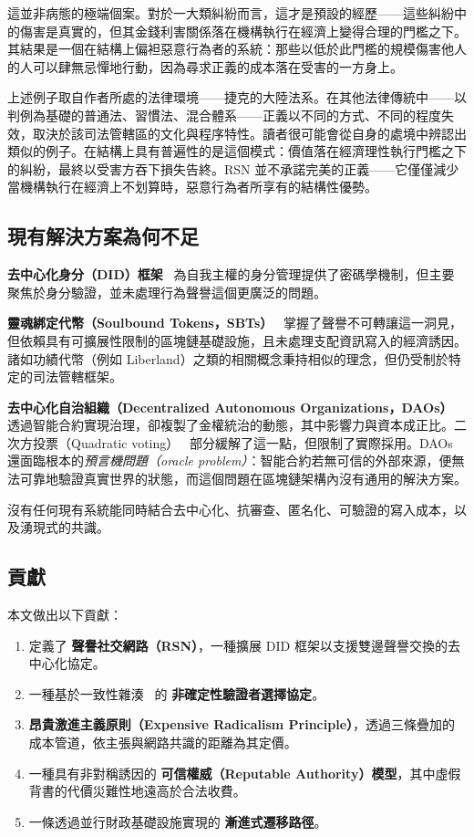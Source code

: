 \documentclass[11pt,a4paper,twocolumn]{article}
\begin{document}
這並非病態的極端個案。對於一大類糾紛而言，這才是預設的經歷——這些糾紛中的傷害是真實的，但其金錢利害關係落在機構執行在經濟上變得合理的門檻之下。其結果是一個在結構上偏袒惡意行為者的系統：那些以低於此門檻的規模傷害他人的人可以肆無忌憚地行動，因為尋求正義的成本落在受害的一方身上。

上述例子取自作者所處的法律環境——捷克的大陸法系。在其他法律傳統中——以判例為基礎的普通法、習慣法、混合體系——正義以不同的方式、不同的程度失效，取決於該司法管轄區的文化與程序特性。讀者很可能會從自身的處境中辨認出類似的例子。在結構上具有普遍性的是這個模式：價值落在經濟理性執行門檻之下的糾紛，最終以受害方吞下損失告終。RSN 並不承諾完美的正義——它僅僅減少當機構執行在經濟上不划算時，惡意行為者所享有的結構性優勢。

\subsection{現有解決方案為何不足}

\textbf{去中心化身分（DID）框架}~\cite{did2022} 為自我主權的身分管理提供了密碼學機制，但主要聚焦於身分驗證，並未處理行為聲譽這個更廣泛的問題。

\textbf{靈魂綁定代幣（Soulbound Tokens，SBTs）}~\cite{weyl2022} 掌握了聲譽不可轉讓這一洞見，但依賴具有可擴展性限制的區塊鏈基礎設施，且未處理支配資訊寫入的經濟誘因。諸如功績代幣（例如 Liberland）之類的相關概念秉持相似的理念，但仍受制於特定的司法管轄框架。

\textbf{去中心化自治組織（Decentralized Autonomous Organizations，DAOs）}~\cite{buterin2014} 透過智能合約實現治理，卻複製了金權統治的動態，其中影響力與資本成正比。二次方投票（Quadratic voting）~\cite{buterin2019} 部分緩解了這一點，但限制了實際採用。DAOs 還面臨根本的\emph{預言機問題（oracle problem）}：智能合約若無可信的外部來源，便無法可靠地驗證真實世界的狀態，而這個問題在區塊鏈架構內沒有通用的解決方案。

沒有任何現有系統能同時結合去中心化、抗審查、匿名化、可驗證的寫入成本，以及湧現式的共識。

\subsection{貢獻}

本文做出以下貢獻：
\begin{enumerate}[nosep]
\item 定義了 \textbf{聲譽社交網路（RSN）}，一種擴展 DID 框架以支援雙邊聲譽交換的去中心化協定。
\item 一種基於一致性雜湊~\cite{karger1997} 的 \textbf{非確定性驗證者選擇協定}。
\item \textbf{昂貴激進主義原則（Expensive Radicalism Principle）}，透過三條疊加的成本管道，依主張與網路共識的距離為其定價。
\item 一種具有非對稱誘因的 \textbf{可信權威（Reputable Authority）模型}，其中虛假背書的代價災難性地遠高於合法收費。
\item 一條透過並行財政基礎設施實現的 \textbf{漸進式遷移路徑}。
\end{enumerate}
\end{document}
